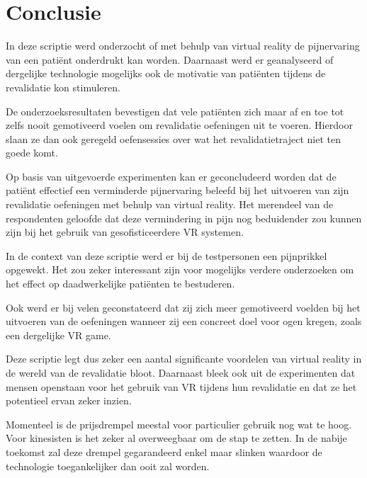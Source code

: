 
\chapter{Conclusie}
\label{ch:conclusie}


In deze scriptie werd onderzocht of met behulp van virtual reality de pijnervaring van een patiënt onderdrukt kan worden. Daarnaast werd er geanalyseerd of dergelijke technologie mogelijks ook de motivatie van patiënten tijdens de revalidatie kon stimuleren.

De onderzoeksresultaten bevestigen dat vele patiënten zich maar af en toe tot zelfs nooit gemotiveerd voelen om revalidatie oefeningen uit te voeren. Hierdoor slaan ze dan ook geregeld oefensessies over wat het revalidatietraject niet ten goede komt.

Op basis van uitgevoerde experimenten kan er geconcludeerd worden dat de patiënt effectief een verminderde pijnervaring beleefd bij het uitvoeren van zijn revalidatie oefeningen met behulp van virtual reality. Het merendeel van de respondenten geloofde dat deze vermindering in pijn nog beduidender zou kunnen zijn bij het gebruik van gesofisticeerdere VR systemen.

In de context van deze scriptie werd er bij de testpersonen een pijnprikkel opgewekt. Het zou zeker interessant zijn voor mogelijks verdere onderzoeken om het effect op daadwerkelijke patiënten te bestuderen.

Ook werd er bij velen geconstateerd dat zij zich meer gemotiveerd voelden bij het uitvoeren van de oefeningen wanneer zij een concreet doel voor ogen kregen, zoals een dergelijke VR game.

Deze scriptie legt dus zeker een aantal significante voordelen van virtual reality in de wereld van de revalidatie bloot. Daarnaast bleek ook uit de experimenten dat mensen openstaan voor het gebruik van VR tijdens hun revalidatie en dat ze het potentieel ervan zeker inzien.

Momenteel is de prijsdrempel meestal voor particulier gebruik nog wat te hoog. Voor kinesisten is het zeker al overweegbaar om de stap te zetten. In de nabije toekomst zal deze drempel gegarandeerd enkel maar slinken waardoor de technologie toegankelijker dan ooit zal worden.

